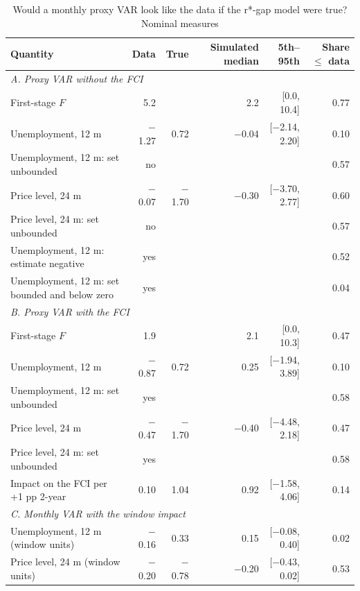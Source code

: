 \begin{table}[p]\centering\footnotesize\setlength{\tabcolsep}{3pt}
\caption{Would a monthly proxy VAR look like the data if the r*-gap model were true? Nominal measures}\label{tab:proxysimnom}
\begin{tabular}{lrrrrr}\toprule Quantity & Data & True & Simulated median & 5th--95th & Share $\le$ data\\ \midrule
\multicolumn{6}{l}{\textit{A. Proxy VAR without the FCI}}\\
\quad First-stage $F$ & 5.2 &  & 2.2 & [0.0, 10.4] & 0.77\\
\quad Unemployment, 12 m & $-$1.27 & 0.72 & $-$0.04 & [$-$2.14, 2.20] & 0.10\\
\quad Unemployment, 12 m: set unbounded & no &  &  &  & 0.57\\
\quad Price level, 24 m & $-$0.07 & $-$1.70 & $-$0.30 & [$-$3.70, 2.77] & 0.60\\
\quad Price level, 24 m: set unbounded & no &  &  &  & 0.57\\
\quad Unemployment, 12 m: estimate negative & yes &  &  &  & 0.52\\
\quad Unemployment, 12 m: set bounded and below zero & yes &  &  &  & 0.04\\
\multicolumn{6}{l}{\textit{B. Proxy VAR with the FCI}}\\
\quad First-stage $F$ & 1.9 &  & 2.1 & [0.0, 10.3] & 0.47\\
\quad Unemployment, 12 m & $-$0.87 & 0.72 & 0.25 & [$-$1.94, 3.89] & 0.10\\
\quad Unemployment, 12 m: set unbounded & yes &  &  &  & 0.58\\
\quad Price level, 24 m & $-$0.47 & $-$1.70 & $-$0.40 & [$-$4.48, 2.18] & 0.47\\
\quad Price level, 24 m: set unbounded & yes &  &  &  & 0.58\\
\quad Impact on the FCI per +1 pp 2-year & 0.10 & 1.04 & 0.92 & [$-$1.58, 4.06] & 0.14\\
\multicolumn{6}{l}{\textit{C. Monthly VAR with the window impact}}\\
\quad Unemployment, 12 m (window units) & $-$0.16 & 0.33 & 0.15 & [$-$0.08, 0.40] & 0.02\\
\quad Price level, 24 m (window units) & $-$0.20 & $-$0.78 & $-$0.20 & [$-$0.43, 0.02] & 0.53\\
\bottomrule\end{tabular}

\end{table}
